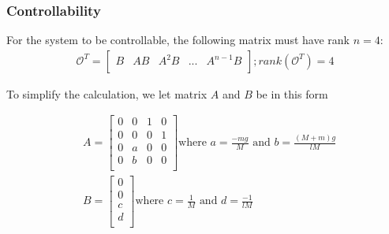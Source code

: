 \documentclass [12pt,letterpaper]{exam}
\begin{document}
\subsubsection{Controllability}

For the system to be controllable, the following matrix must have rank $n = 4$:
\begin{align}
\mathcal{O}^T =
\begin{bmatrix}
B & AB & A^2B & ... & A^{n-1}B \\
\end{bmatrix} ; rank(\mathcal{O}^T) = 4 
\end{align}

To simplify the calculation, we let matrix $A$ and $B$ be in this form

\begin{align}
& A = \begin{bmatrix}
0 & 0 & 1 & 0 \\
0 & 0 & 0 & 1 \\
0 & a & 0 & 0 \\
0 & b & 0 & 0 \\
\end{bmatrix} \mbox{where } a = \frac{-mg}{M} \mbox{ and } b = \frac{(M + m)g}{lM} \\
& B = \begin{bmatrix}
0 \\
0 \\
c \\
d \\
\end{bmatrix} \mbox{where } c = \frac{1}{M} \mbox{ and } d = \frac{-1}{lM}
\end{align}
\end{document}
